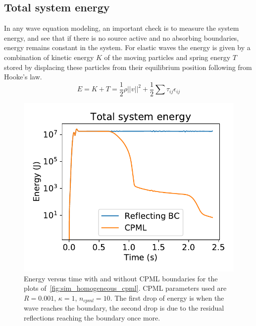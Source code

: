 \documentclass[10pt]{SelfArx} %
\theoremstyle{definition}
\begin{document}
\subsection{Total system energy}
In any wave equation modeling, an important check is to measure the system energy, and see that if there is no source active and no absorbing boundaries, energy remains constant in the system.
For elastic waves the energy is given by a combination of kinetic energy $K$ of the moving particles and spring energy $T$ stored by displacing these particles from their equilibrium position following from Hooke's law.
\begin{equation}\label{eq:elastic_system_energy}
E = K + T = \frac{1}{2}\rho ||v||^2 + \frac{1}{2}\sum\tau_{ij}\epsilon_{ij}
\end{equation}
\begin{figure}[h]\centering %
\includegraphics[width=0.5\linewidth]{"fig/Energy_cpml_comparison"}
\caption{Energy versus time with and without CPML boundaries for the plots of~\cref{fig:sim_homogeneous_cpml}. CPML parameters used are $R=0.001$, $\kappa = 1$, $n_{cpml}=10$. The first drop of energy is when the wave reaches the boundary, the second drop is due to the residual reflections reaching the boundary once more.}
\label{fig:sim_energy_cpml_no_cpml}
\end{figure}
\end{document}
